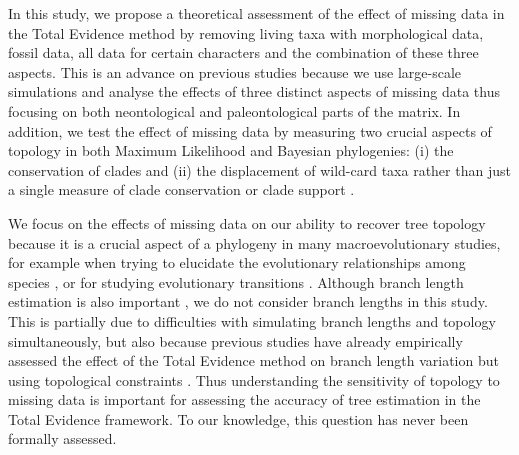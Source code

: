 In this study, we propose a theoretical assessment of the effect of missing data in the Total Evidence method by removing living taxa with morphological data, fossil data, all data for certain characters and the combination of these three aspects.
This is an advance on previous studies because we use large-scale simulations and analyse the effects of three distinct aspects of missing data thus focusing on both neontological and paleontological parts of the matrix.
In addition, we test the effect of missing data by measuring two crucial aspects of topology in both Maximum Likelihood and Bayesian phylogenies: (i) the conservation of clades \citep[based on the Robinson-Foulds distance;][]{RF1981} and (ii) the displacement of wild-card taxa \citep[based on the Triplets distance;][]{critchlowthe1996} rather than just a single measure of clade conservation or clade support \citep[cf.][]{Wiens01102005,pattinsonphylogeny2014}.

We focus on the effects of missing data on our ability to recover tree topology because it is a crucial aspect of a phylogeny in many macroevolutionary studies, for example when trying to elucidate the evolutionary relationships among species \citep[e.g.][]{meredithimpacts2011,jetzthe2012}, or for studying evolutionary transitions \citep[e.g.][]{friedmanexplosive2010}.
Although branch length estimation is also important \citep[namely for timing extinction and/or speciation events; e.g.][]{ronquista2012}, we do not consider branch lengths in this study.
This is partially due to difficulties with simulating branch lengths and topology simultaneously, but also because previous studies have already empirically assessed the effect of the Total Evidence method on branch length variation but using topological constraints \citep{ronquista2012,schragocombining2013,Slater2012MEE,beckancient2014}.
Thus understanding the sensitivity of topology to missing data is important for assessing the accuracy of tree estimation in the Total Evidence framework. To our knowledge, this question has never been formally assessed.

